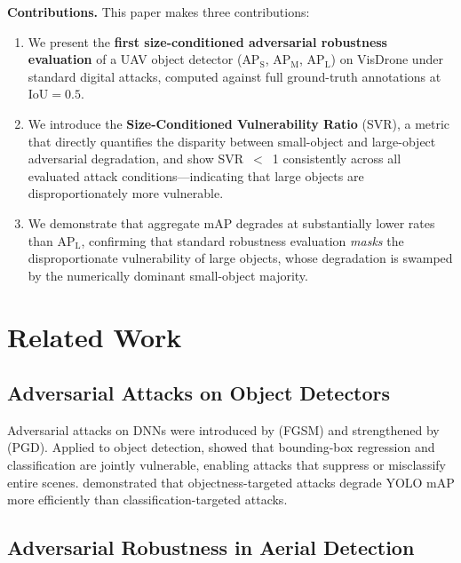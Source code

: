 \documentclass[journal]{IEEEtran}
\begin{document}
\textbf{Contributions.} This paper makes three contributions:

\begin{enumerate}
  \item We present the \textbf{first size-conditioned adversarial
        robustness evaluation} of a UAV object detector
        ($\text{AP}_\text{S}$, $\text{AP}_\text{M}$, $\text{AP}_\text{L}$)
        on VisDrone under standard digital attacks, computed against
        full ground-truth annotations at $\text{IoU}=0.5$.
  \item We introduce the \textbf{Size-Conditioned Vulnerability
        Ratio} (SVR), a metric that directly quantifies the
        disparity between small-object and large-object
        adversarial degradation, and show SVR~$<$~1 consistently
        across all evaluated attack conditions---indicating that
        large objects are disproportionately more vulnerable.
  \item We demonstrate that aggregate mAP degrades at
        substantially lower rates than $\text{AP}_\text{L}$,
        confirming that standard robustness evaluation
        \emph{masks} the disproportionate vulnerability of
        large objects, whose degradation is swamped by the
        numerically dominant small-object majority.
\end{enumerate}

\section{Related Work}
\label{sec:related}

\subsection{Adversarial Attacks on Object Detectors}

Adversarial attacks on DNNs were introduced by
\citet{goodfellow2015fgsm} (FGSM) and strengthened by
\citet{madry2018pgd} (PGD).
Applied to object detection, \citet{xie2017adversarialDet}
showed that bounding-box regression and classification
are jointly vulnerable, enabling attacks that suppress or
misclassify entire scenes.
\citet{adversarialYOLO2022} demonstrated that objectness-targeted
attacks degrade YOLO mAP more efficiently than
classification-targeted attacks.

\subsection{Adversarial Robustness in Aerial Detection}
\end{document}
